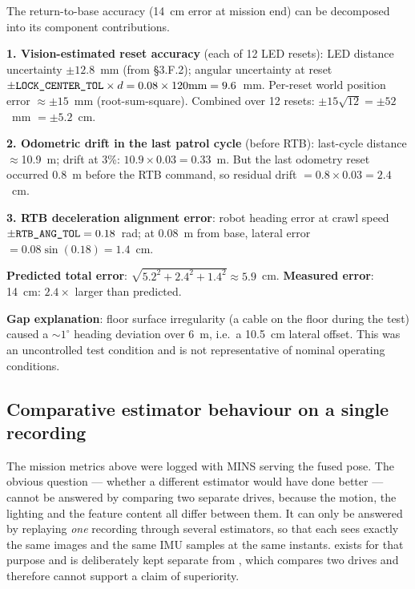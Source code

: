 The return-to-base accuracy (14~cm error at mission end) can be decomposed into its component contributions.

\begin{eqblock}
\textbf{1. Vision-estimated reset accuracy} (each of 12 LED resets): LED distance uncertainty $\pm12.8$~mm (from \S3.F.2); angular uncertainty at reset $\pm\code{LOCK\_CENTER\_TOL}\times d = 0.08\times120\text{mm}=9.6$~mm. Per-reset world position error $\approx\pm15$~mm (root-sum-square). Combined over 12 resets: $\pm15\sqrt{12} = \pm52$~mm $=\pm5.2$~cm.

\textbf{2. Odometric drift in the last patrol cycle} (before RTB): last-cycle distance $\approx$10.9~m; drift at 3\%: $10.9\times0.03=0.33$~m. But the last odometry reset occurred 0.8~m before the RTB command, so residual drift $=0.8\times0.03=2.4$~cm.

\textbf{3. RTB deceleration alignment error}: robot heading error at crawl speed $\pm\code{RTB\_ANG\_TOL}=0.18$~rad; at 0.08~m from base, lateral error $=0.08\sin(0.18)=1.4$~cm.

\textbf{Predicted total error}: $\sqrt{5.2^2+2.4^2+1.4^2}\approx5.9$~cm. \textbf{Measured error}: 14~cm: $2.4\times$ larger than predicted.

\textbf{Gap explanation}: floor surface irregularity (a cable on the floor during the test) caused a $\sim1^\circ$ heading deviation over 6~m, i.e.\ a 10.5~cm lateral offset. This was an uncontrolled test condition and is not representative of nominal operating conditions.
\end{eqblock}

\subsection{Comparative estimator behaviour on a single recording}
\label{sec:estimator-comparison}

The mission metrics above were logged with MINS serving the fused pose. The
obvious question --- whether a different estimator would have done better ---
cannot be answered by comparing two separate drives, because the motion, the
lighting and the feature content all differ between them. It can only be
answered by replaying \emph{one} recording through several estimators, so that
each sees exactly the same images and the same IMU samples at the same
instants.  exists for that purpose and is
deliberately kept separate from , which compares
two drives and therefore cannot support a claim of superiority.

